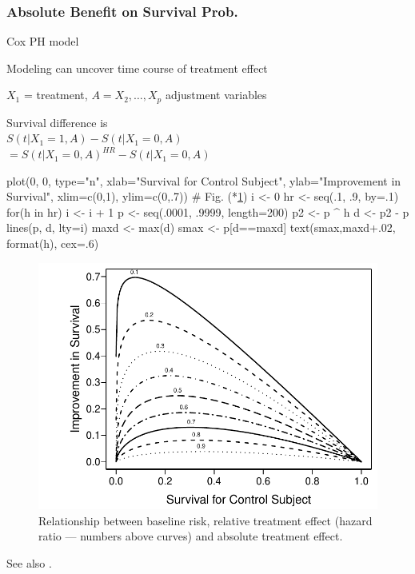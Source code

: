 \subsubsection{Absolute Benefit on Survival Prob.}
\bi
\item   Cox PH model
\item   Modeling can uncover time course of treatment effect
\item   $X_1$ = treatment, $A={X_{2},\ldots,X_{p}}$ adjustment
        variables
\item   Survival difference is \\ $S(t | X_{1}=1, A) - S(t | X_{1}=0, A)$
\\ $ = S(t | X_{1}=0, A)^{HR} - S(t | X_{1}=0, A)$
\begin{Schunk}
\begin{Sinput}
plot(0, 0, type="n", xlab="Survival for Control Subject",
     ylab="Improvement in Survival",
     xlim=c(0,1), ylim=c(0,.7))     # Fig. (*\ref{fig:ancova-hr-vs-surv}\ipacue*)
i <- 0
hr <- seq(.1, .9, by=.1)
for(h in hr) {
  i <- i + 1
  p <- seq(.0001, .9999, length=200)
  p2 <- p ^ h
  d <- p2 - p
  lines(p, d, lty=i)
  maxd <- max(d)
  smax <- p[d==maxd]
  text(smax,maxd+.02, format(h), cex=.6)
}
\end{Sinput}
\begin{figure}[htbp]

\centerline{\includegraphics[width=\maxwidth]{ancova-hr-vs-surv-1} }

\caption[Baseline risk, hazard ratio, and absolute effect]{Relationship between baseline risk, relative treatment effect (hazard ratio --- numbers above curves) and absolute treatment effect.}\label{fig:ancova-hr-vs-surv}
\end{figure}
\end{Schunk}
\item See also \cite{ken07lim}.
\ei

